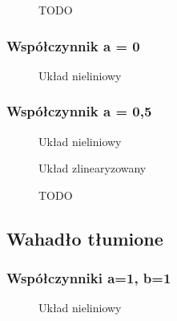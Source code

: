 \documentclass[a4paper, 10pt]{article}
\begin{document}
				
				
				\begin{figure}[H]
					\centering
					\def \svgwidth{0.75\columnwidth}
					
					\caption{TODO}
				\end{figure}\noindent
			
			\subsubsection{Współczynnik a = 0}
				\begin{figure}[H]
					\centering
					\def \svgwidth{0.75\columnwidth}
					
					\caption{Układ nieliniowy}
				\end{figure}\noindent
			
			
			\subsubsection{Współczynnik a = 0,5}
				\begin{figure}[H]
					\centering
					\def \svgwidth{0.75\columnwidth}
					
					\caption{Układ nieliniowy}
				\end{figure}\noindent
				
				
				\begin{figure}[H]
					\centering
					\def \svgwidth{0.75\columnwidth}
					
					\caption{Układ zlinearyzowany}
				\end{figure}\noindent
				
				
				\begin{figure}[H]
					\centering
					\def \svgwidth{0.75\columnwidth}
					
					\caption{TODO}
				\end{figure}\noindent
			
		\subsection{Wahadło tłumione}
			\subsubsection{Współczynniki a=1, b=1}
				\begin{figure}[H]
					\centering
					\def \svgwidth{0.75\columnwidth}
					
					\caption{Układ nieliniowy}
				\end{figure}\noindent
				
\end{document}
